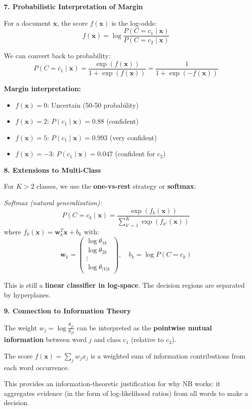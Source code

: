 \documentclass[12pt]{article}
\begin{document}
\begin{explanation}
\textbf{7. Probabilistic Interpretation of Margin}

For a document $\mathbf{x}$, the score $f(\mathbf{x})$ is the log-odds:
\[
f(\mathbf{x}) = \log \frac{P(C = c_1 \mid \mathbf{x})}{P(C = c_2 \mid \mathbf{x})}
\]

We can convert back to probability:
\[
P(C = c_1 \mid \mathbf{x}) = \frac{\exp(f(\mathbf{x}))}{1 + \exp(f(\mathbf{x}))} = \frac{1}{1 + \exp(-f(\mathbf{x}))}
\]

\textbf{Margin interpretation:}
\begin{itemize}
    \item $f(\mathbf{x}) = 0$: Uncertain (50-50 probability)
    \item $f(\mathbf{x}) = 2$: $P(c_1 \mid \mathbf{x}) = 0.88$ (confident)
    \item $f(\mathbf{x}) = 5$: $P(c_1 \mid \mathbf{x}) = 0.993$ (very confident)
    \item $f(\mathbf{x}) = -3$: $P(c_1 \mid \mathbf{x}) = 0.047$ (confident for $c_2$)
\end{itemize}

\textbf{8. Extensions to Multi-Class}

For $K > 2$ classes, we use the \textbf{one-vs-rest} strategy or \textbf{softmax}:

\textit{Softmax (natural generalization):}
\[
P(C = c_k \mid \mathbf{x}) = \frac{\exp(f_k(\mathbf{x}))}{\sum_{k'=1}^{K} \exp(f_{k'}(\mathbf{x}))}
\]
where $f_k(\mathbf{x}) = \mathbf{w}_k^T \mathbf{x} + b_k$ with:
\[
\mathbf{w}_k = \begin{pmatrix}
\log \theta_{1k} \\
\log \theta_{2k} \\
\vdots \\
\log \theta_{|V|k}
\end{pmatrix}, \quad b_k = \log P(C = c_k)
\]

This is still a \textbf{linear classifier in log-space}. The decision regions are separated by hyperplanes.

\textbf{9. Connection to Information Theory}

The weight $w_j = \log \frac{\theta_{j1}}{\theta_{j2}}$ can be interpreted as the \textbf{pointwise mutual information} between word $j$ and class $c_1$ (relative to $c_2$).

The score $f(\mathbf{x}) = \sum_j w_j x_j$ is a weighted sum of information contributions from each word occurrence.

This provides an information-theoretic justification for why NB works: it aggregates evidence (in the form of log-likelihood ratios) from all words to make a decision.


\end{explanation}
\end{document}
